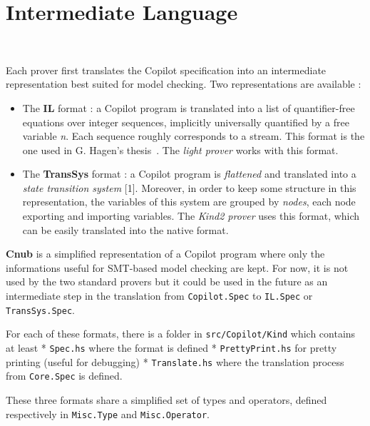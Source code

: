 \section{Intermediate Language}~\label{sec:il}

Each prover first translates the Copilot specification into an
intermediate representation best suited for model checking. Two
representations are available :

\begin{itemize}
\item
  The \textbf{IL} format : a Copilot program is translated into a list
  of quantifier-free equations over integer sequences, implicitly
  universally quantified by a free variable \emph{n}. Each sequence
  roughly corresponds to a stream. This format is the one used in G.
  Hagen's thesis~\cite{HagenPhD}. The \emph{light prover} works with this
  format.
\item
  The \textbf{TransSys} format : a Copilot program is \emph{flattened}
  and translated into a \emph{state transition system} {[}1{]}.
  Moreover, in order to keep some structure in this representation, the
  variables of this system are grouped by \emph{nodes}, each node
  exporting and importing variables. The \emph{Kind2 prover} uses this
  format, which can be easily translated into the native format.
\end{itemize}

\textbf{Cnub} is a simplified representation of a Copilot program where
only the informations useful for SMT-based model checking are kept. For
now, it is not used by the two standard provers but it could be used in
the future as an intermediate step in the translation from
\texttt{Copilot.Spec} to \texttt{IL.Spec} or \texttt{TransSys.Spec}.

For each of these formats, there is a folder in
\texttt{src/Copilot/Kind} which contains at least * \texttt{Spec.hs}
where the format is defined * \texttt{PrettyPrint.hs} for pretty
printing (useful for debugging) * \texttt{Translate.hs} where the
translation process from \texttt{Core.Spec} is defined. 

These three formats share a simplified set of types and operators,
defined respectively in \texttt{Misc.Type} and \texttt{Misc.Operator}.




